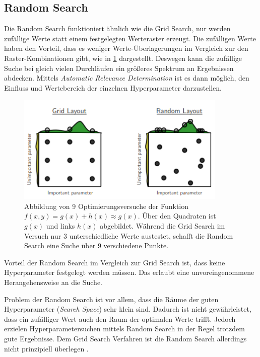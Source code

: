 \subsection{Random Search}
Die Random Search \cite{hyperparameters-random-search} funktioniert ähnlich wie die Grid Search, nur werden zufällige Werte statt einem festgelegten Werteraster erzeugt.
Die zufälligen Werte haben den Vorteil, dass es weniger Werte-Überlagerungen im Vergleich zur den Raster-Kombinationen gibt, wie in \cref{randomsearch-vs-gridsearch} dargestellt.
Deswegen kann die zufällige Suche bei gleich vielen Durchläufen ein größeres Spektrum an Ergebnissen abdecken.
Mittels \textit{Automatic Relevance Determination} \cite{automatic-relevance-determination} ist es dann möglich, den Einfluss und Wertebereich der einzelnen Hyperparameter darzustellen.

\begin{figure}[H]
	\centering
	\includegraphics[width=10cm]{kapitel/2_stand_der_technik/img/random-vs-grid-search1.png}
	\caption[Vergleich zwischen Grid Search und Random Search]{
		Abbildung von 9 Optimierungsversuche der Funktion $f(x,y)=g(x)+h(x) \approx g(x)$.
		Über den Quadraten ist $g(x)$ und links $h(x)$ abgebildet.
		Während die Grid Search im Versuch nur 3 unterschiedliche Werte austestet, schafft die Random Search eine Suche über 9 verschiedene Punkte.
		\cite{hyperparameters-random-search}}
	\label{randomsearch-vs-gridsearch}
\end{figure}

Vorteil der Random Search im Vergleich zur Grid Search ist, dass keine Hyperparameter festgelegt werden müssen.
Das erlaubt eine unvoreingenommene Herangehensweise an die Suche.
\newline

Problem der Random Search ist vor allem, dass die Räume der guten Hyperparameter (\textit{Search Space}) sehr klein sind.
Dadurch ist nicht gewährleistet, dass ein zufälliger Wert auch den Raum der optimalen Werte trifft.
Jedoch erzielen Hyperparametersuchen mittels Random Search in der Regel trotzdem gute Ergebnisse.
Dem Grid Search Verfahren ist die Random Search allerdings nicht prinzipiell überlegen \cite{hyperparameters-random-search}.
\newline

